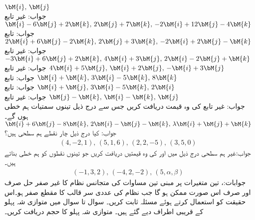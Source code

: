 \quad
$\bM{i},\, \bM{j}$\\
جواب: غیر تابع
\quad
$\bM{i}-6\bM{j}+2\bM{k},\, 2\bM{j}+7\bM{k},\, -2\bM{i}+12\bM{j}-4\bM{k}$\\
جواب: تابع
\quad
$2\bM{i}+6\bM{j}-2\bM{k},\, 2\bM{j}+3\bM{k},\, -2\bM{i}+2\bM{j}-\bM{k}$\\
جواب: غیر تابع
\quad
$-3\bM{i}+6\bM{j}+2\bM{k},\, 4\bM{i}+3\bM{j},\, 2\bM{i}-2\bM{j}+\bM{k}$\\
جواب: غیر تابع
\quad
$4\bM{i}+5\bM{j},\, \bM{i}+2\bM{j},\, -\bM{i}+3\bM{j}$\\
جواب: تابع
\quad
$\bM{i}+\bM{k},\, 3\bM{i}-5\bM{k},\, 8\bM{k}$\\
جواب: تابع
\quad
$\bM{i}+\bM{j},\, 3\bM{i}-5\bM{k},\, 2\bM{i}$\\
جواب: غیر تابع
\quad
$\bM{j}-\bM{k},\, \bM{i}-\bM{k},\, \bM{j}$\\
جواب: غیر تابع
\quad
{} کی وہ قیمت دریافت کریں جس سے درج ذیل تینوں سمتیات ہم خطی ہوں گے۔\\
$\bM{i}+6\bM{j}-8\bM{k},\, 2\bM{i}-\bM{j}-\bM{k},\, \lambda\bM{i}+\bM{j}+\bM{k}$\\
جواب:
کیا درج ذیل چار نقطے ہم سطحی ہیں؟
\begin{align*}
(4,-2,1),\,(5,1,6),\,(2,2,-5),\,(3,5,0)
\end{align*}
جواب:غیر ہم سطحی
درج ذیل میں  اور  کی وہ قیمتیں دریافت کریں جو تینوں نقطوں کو ہم خطی بناتے ہیں۔
\begin{align*}
(-1,3,2),\, (-4,2,-2),\, (5,\alpha,\beta)
\end{align*}
جوابات:، 
تین متغیرات پر مبنی تین مساوات کی متجانس نظام کا غیر صفر حل صرف اور صرف اس صورت ممکن ہو گا جب نظام کی عددی سر قالب کا مقطع صفر ہو۔اس حقیقت کو استعمال کرتے ہوئے مسئلہ  ثابت کریں۔ 
سوال  تا سوال  میں متوازی شہ پہلو کے قریبی اطراف دیے گئے ہیں۔ متوازی شہ پہلو کا حجم دریافت کریں۔

